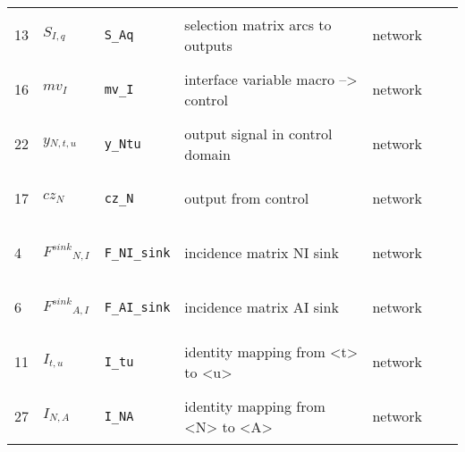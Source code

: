 \begin{longtable}{|p{1cm}|p{2.5cm}|p{4.5cm}|p{8cm}|p{3.0cm}|p{3cm}|p{1cm}|}
            13
             & \hypertarget{"v:13"}{ $ {{S}}{_{I, q}} $}
             & \verb|S_Aq|
             & selection matrix arcs to outputs
             & \begin{lay}network \end{lay}
             & $  $
             & \\
            16
             & \hypertarget{"v:16"}{ $ {{mv}}{_{I}} $}
             & \verb|mv_I|
             & interface variable macro --> control
             & \begin{lay}network \end{lay}
             & $  $
             & \\
            22
             & \hypertarget{"v:22"}{ $ {{y}}{_{N, t, u}} $}
             & \verb|y_Ntu|
             & output signal in control domain
             & \begin{lay}network \end{lay}
             & $  $
             & \\
            17
             & \hypertarget{"v:17"}{ $ {{cz}}{_{N}} $}
             & \verb|cz_N|
             & output from control
             & \begin{lay}network \end{lay}
             & $  $
             & \\
            4
             & \hypertarget{"v:4"}{ $ {{F^{sink}}}{_{N, I}} $}
             & \verb|F_NI_sink|
             & incidence matrix NI sink
             & \begin{lay}network \end{lay}
             & $  $
             & \\
            6
             & \hypertarget{"v:6"}{ $ {{F^{sink}}}{_{A, I}} $}
             & \verb|F_AI_sink|
             & incidence matrix AI sink
             & \begin{lay}network \end{lay}
             & $  $
             & \\
            11
             & \hypertarget{"v:11"}{ $ {{I}}{_{t, u}} $}
             & \verb|I_tu|
             & identity mapping from <t> to <u>
             & \begin{lay}network \end{lay}
             & $  $
             & \\
            27
             & \hypertarget{"v:27"}{ $ {{I}}{_{N, A}} $}
             & \verb|I_NA|
             & identity mapping from <N> to <A>
             & \begin{lay}network \end{lay}

\end{longtable}
